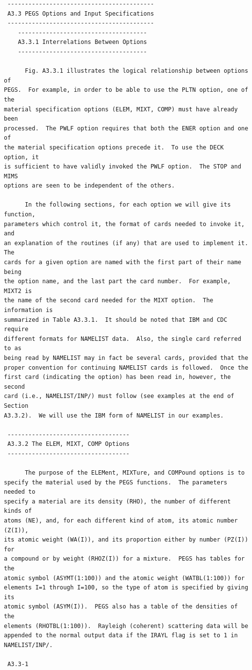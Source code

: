 \begin{verbatim}
 ------------------------------------------
 A3.3 PEGS Options and Input Specifications
 ------------------------------------------
    -------------------------------------
    A3.3.1 Interrelations Between Options
    -------------------------------------
 
      Fig. A3.3.1 illustrates the logical relationship between options of
PEGS.  For example, in order to be able to use the PLTN option, one of the
material specification options (ELEM, MIXT, COMP) must have already been
processed.  The PWLF option requires that both the ENER option and one of
the material specification options precede it.  To use the DECK option, it
is sufficient to have validly invoked the PWLF option.  The STOP and MIMS
options are seen to be independent of the others.
 
      In the following sections, for each option we will give its function,
parameters which control it, the format of cards needed to invoke it, and
an explanation of the routines (if any) that are used to implement it.  The
cards for a given option are named with the first part of their name being
the option name, and the last part the card number.  For example, MIXT2 is
the name of the second card needed for the MIXT option.  The information is
summarized in Table A3.3.1.  It should be noted that IBM and CDC require
different formats for NAMELIST data.  Also, the single card referred to as
being read by NAMELIST may in fact be several cards, provided that the
proper convention for continuing NAMELIST cards is followed.  Once the
first card (indicating the option) has been read in, however, the second
card (i.e., NAMELIST/INP/) must follow (see examples at the end of Section
A3.3.2).  We will use the IBM form of NAMELIST in our examples.

 -----------------------------------
 A3.3.2 The ELEM, MIXT, COMP Options
 -----------------------------------
 
      The purpose of the ELEMent, MIXTure, and COMPound options is to
specify the material used by the PEGS functions.  The parameters needed to
specify a material are its density (RHO), the number of different kinds of
atoms (NE), and, for each different kind of atom, its atomic number (Z(I)),
its atomic weight (WA(I)), and its proportion either by number (PZ(I)) for
a compound or by weight (RHOZ(I)) for a mixture.  PEGS has tables for the
atomic symbol (ASYMT(1:100)) and the atomic weight (WATBL(1:100)) for
elements I=1 through I=100, so the type of atom is specified by giving its
atomic symbol (ASYM(I)).  PEGS also has a table of the densities of the
elements (RHOTBL(1:100)).  Rayleigh (coherent) scattering data will be
appended to the normal output data if the IRAYL flag is set to 1 in
NAMELIST/INP/.  

 A3.3-1
\end{verbatim} 
